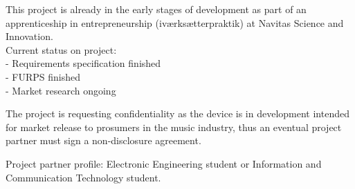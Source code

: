 This project is already in the early stages of development as part of an apprenticeship in
entrepreneurship (iværksætterpraktik) at Navitas Science and Innovation. \\
Current status on project: \\
- Requirements specification finished \\
- FURPS finished \\
- Market research ongoing \newline

The project is requesting confidentiality as the device is in development intended for market release to
prosumers in the music industry, thus an eventual project partner must sign a non-disclosure
agreement. \newline

Project partner profile: Electronic Engineering student or Information and Communication
Technology student.